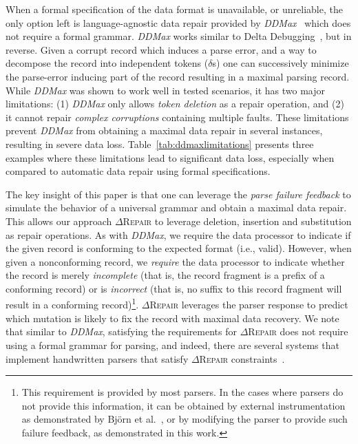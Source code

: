 \documentclass[acmsmall,screen,review,anonymous]{acmart}
\newcommand{\dtask}{data repair\xspace}
\newcommand{\approach}{\textsc{$\Delta$Repair}\xspace}
\newcommand{\ddmax}{\textit{DDMax}\xspace}
\begin{document}
When a formal specification of the data format is unavailable, or unreliable,
the only option left is language-agnostic \dtask provided by
\ddmax~\cite{kirschner2020debugging} which does not require a formal grammar.
\ddmax works similar to Delta Debugging~\cite{zeller2002simplifying},
but in reverse.
Given a corrupt record which induces a parse error,
and a way to decompose the record into independent tokens ($\delta$s)
one can successively minimize the parse-error inducing part of the
record resulting in a maximal parsing record.
While \ddmax was shown to work well in tested scenarios, it has two major limitations:
(1) \ddmax only allows \emph{token deletion} as a repair operation, and 
(2) it cannot repair \emph{complex corruptions} containing multiple faults.
These limitations prevent \ddmax from obtaining a maximal data repair in
several instances, resulting in severe data loss.
Table~\ref{tab:ddmaxlimitations} presents three examples where these
limitations lead to significant data loss, especially when compared to
automatic \dtask using formal specifications.

The key insight of this paper is that one can leverage the \emph{parse failure feedback}
to simulate the behavior of a universal grammar and obtain a maximal data repair.
This allows our approach \approach to leverage deletion, insertion and substitution as repair
operations. %
As with \ddmax, we require the data processor to indicate if the given record
is conforming to the expected format (i.e., valid).  However, when given a nonconforming record,
we \textit{require} the data processor to indicate whether the record is
merely \emph{incomplete} (that is, the record fragment is a prefix of a conforming record)
or is \emph{incorrect} (that is, no suffix to
this record fragment will result in a conforming record)\footnote{This requirement is
provided by most parsers. %
In the cases where parsers do not provide
this information, it can be obtained
by external instrumentation 
as demonstrated by Bj\"orn et al.~\cite{mathis2019parser}, or 
by modifying the parser to provide such failure feedback, as demonstrated in this work. 
}. \approach leverages the parser response to predict which mutation is likely to fix the record with maximal data recovery. 
We note that similar to \ddmax,
satisfying the requirements for \approach does not require using a
formal grammar for parsing, and indeed, there are several systems that
implement handwritten parsers that satisfy \approach
constraints~\cite{eaton2021parser}.
\end{document}
